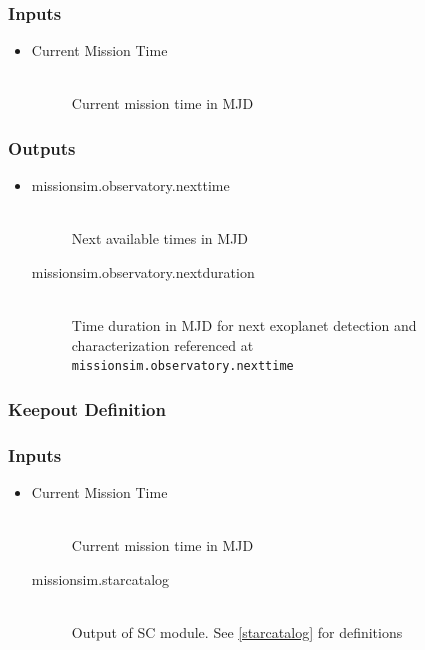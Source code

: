 \documentclass[]{asme2ej}
\begin{document}
\subsubsection*{Inputs}
\begin{itemize}
    \item
    \begin{description}
        \item[Current Mission Time] \hfill \\
        Current mission time in MJD
    \end{description}
\end{itemize}

\subsubsection*{Outputs}
\begin{itemize}
    \item
    \begin{description}
        \item[missionsim.observatory.nexttime] \hfill \\
        Next available times in MJD
        \item[missionsim.observatory.nextduration] \hfill \\
        Time duration in MJD for next exoplanet detection and characterization referenced at \\ \texttt{missionsim.observatory.nexttime}
    \end{description}
\end{itemize}

\subsubsection{Keepout Definition}

\subsubsection*{Inputs}
\begin{itemize}
    \item
    \begin{description}
        \item[Current Mission Time] \hfill \\
        Current mission time in MJD 
        \item[missionsim.starcatalog] \hfill \\
        Output of SC module. See \ref{starcatalog} for definitions
    \end{description}
\end{itemize}
\end{document}
